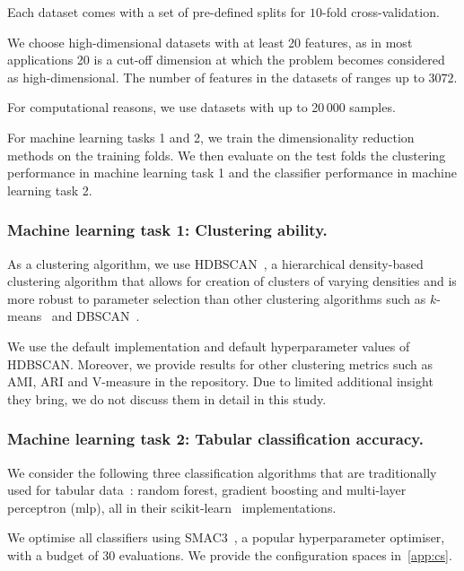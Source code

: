 Each dataset comes with a set of pre-defined splits for $10$-fold cross-validation.

We choose high-dimensional datasets with at least 20 features, as in most applications 20 is a cut-off dimension at which the problem becomes considered as high-dimensional. The number of features in the datasets of ranges up to $3072$.


For computational reasons, we use datasets with up to 20\,000 samples. 



For machine learning tasks 1 and 2, we train the dimensionality reduction methods on the training folds. 
We then evaluate on the test folds the clustering performance in machine learning task 1 and the classifier performance in machine learning task 2.








\subsubsection*{Machine learning task 1: Clustering ability.}

As a clustering algorithm, we use HDBSCAN~\citep{CamEtAl13}, a hierarchical density-based clustering algorithm that allows for creation of clusters of varying densities and is more robust to parameter selection than other clustering algorithms such as $k$-means~\citep{KanEtAl02} and DBSCAN~\citep{EstEtAl96}.

We use the default implementation and default hyperparameter values of HDBSCAN.
Moreover, we provide results for other clustering metrics such as AMI, ARI and V-measure in the repository.
Due to limited additional insight they bring, we do not discuss them in detail in this study.


\subsubsection*{Machine learning task 2: Tabular classification accuracy.}
We consider the following three classification algorithms that are traditionally used for tabular data~\citep{GriEtAl22}: random forest, gradient boosting and multi-layer perceptron (\gls{mlp}), all in their scikit-learn~\citep{PedEtAl11} implementations.

We optimise all classifiers using SMAC3~\citep{LinEtAl22b}, a popular hyperparameter optimiser, with a budget of 30 evaluations. We provide the configuration spaces in~\cref{app:cs}.









